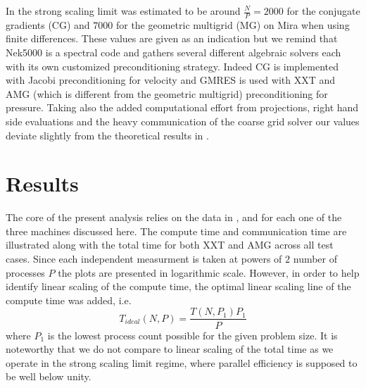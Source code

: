 \documentclass{sig-alternate}
\begin{document}
In \cite{fischer:scaling} the strong scaling limit  was estimated
to be around $\frac{N}{P}=2000$ for the conjugate gradients (CG) and %
$7000$ for the geometric multigrid (MG) on Mira when using finite
differences. These values are given as an indication %
but we remind that Nek5000 is a spectral code and gathers several different algebraic 
solvers each with its own customized preconditioning strategy. Indeed CG is implemented 
with Jacobi preconditioning for velocity and GMRES is used with XXT and AMG (which 
is different from the geometric multigrid) preconditioning for pressure. 
Taking also the added computational effort from projections, right hand side 
evaluations and the heavy communication of the coarse grid solver our values deviate
slightly from the theoretical results in \cite{fischer:scaling}. 

\section{Results}


The core of the present analysis relies on the data in ,  and  for each one of the three machines discussed here. 
The compute time and
communication time are illustrated along with the total time for both XXT and AMG across all test cases. 
Since each independent measurment is taken at powers of $2$ number of processes $P$ 
the plots are presented in logarithmic scale. However, in order to help identify linear scaling of the
compute time, the optimal linear scaling line of the compute time was added, i.e.
$$
T_{ideal}(N,P)=\frac{T(N,P_1)P_1}{P}
$$
where $P_1$ is the lowest process count possible for the given problem size. It is noteworthy that we do not compare to linear scaling of the total time as we operate in the strong scaling limit regime, where parallel efficiency is supposed to be well below unity.
\end{document}
